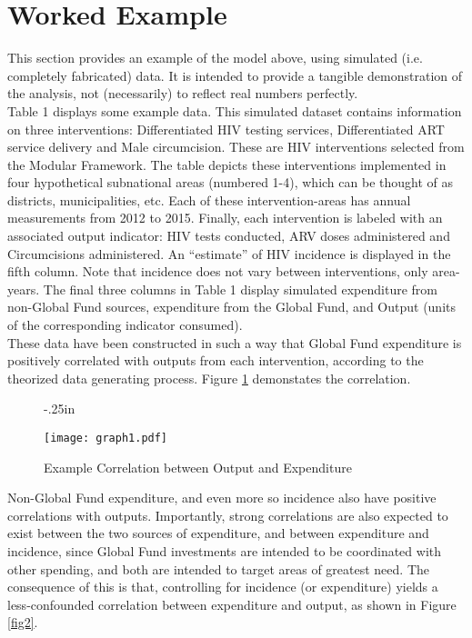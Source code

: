 \documentclass[twocolumn]{bmcart}%
\begin{document}


\clearpage


\section{Worked Example}


This section provides an example of the model above, using simulated (i.e. completely fabricated) data. It is intended to provide a tangible demonstration of the analysis, not (necessarily) to reflect real numbers perfectly. \\

Table 1 displays some example data. This simulated dataset contains information on three interventions: Differentiated HIV testing services, Differentiated ART service delivery and Male circumcision. These are HIV interventions selected from the Modular Framework. The table depicts these interventions implemented in four hypothetical subnational areas (numbered 1-4), which can be thought of as districts, municipalities, etc. Each of these intervention-areas has annual measurements from 2012 to 2015. Finally, each intervention is labeled with  an associated output indicator: HIV tests conducted, ARV doses administered and Circumcisions administered. An ``estimate'' of HIV incidence is displayed in the fifth column. Note that incidence does not vary between interventions, only area-years. The final three columns in Table 1 display simulated expenditure from non-Global Fund sources, expenditure from the Global Fund, and Output (units of the corresponding indicator consumed). \\

These data have been constructed in such a way that Global Fund expenditure is positively correlated with outputs from each intervention, according to the theorized data generating process. Figure \ref{fig1} demonstates the correlation. \\

\begin{figure}[h]
  \advance\leftskip-.25in
  \caption{\textmd{Example Correlation between Output and Expenditure}}
  \texttt{[image: graph1.pdf]} \\
  \label{fig1}
\end{figure}

Non-Global Fund expenditure, and even more so incidence also have positive correlations with outputs. Importantly, strong correlations are also expected to exist between the two sources of expenditure, and between expenditure and incidence, since Global Fund investments are intended to be coordinated with other spending, and both are intended to target areas of greatest need. The consequence of this is that, controlling for incidence (or expenditure) yields a less-confounded correlation between expenditure and output, as shown in Figure \ref{fig2}.
\end{document}
